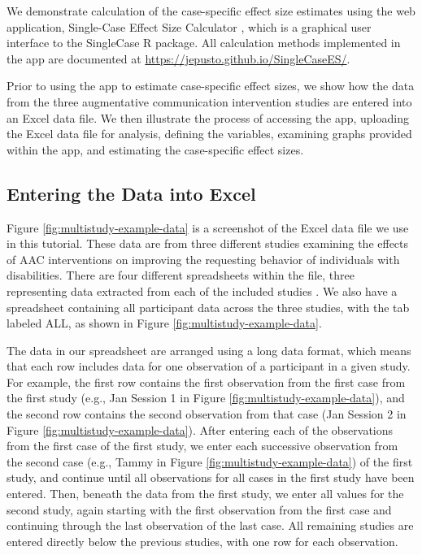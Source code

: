 \documentclass[
]{book}
\begin{document}
We demonstrate calculation of the case-specific effect size estimates using the web application, Single-Case Effect Size Calculator \citep{pustejovsky2023SingleCaseES}, which is a graphical user interface to the SingleCase R package. All calculation methods implemented in the app are documented at \url{https://jepusto.github.io/SingleCaseES/}.

Prior to using the app to estimate case-specific effect sizes, we show how the data from the three augmentative communication intervention studies are entered into an Excel data file. We then illustrate the process of accessing the app, uploading the Excel data file for analysis, defining the variables, examining graphs provided within the app, and estimating the case-specific effect sizes.

\hypertarget{entering-the-data-into-excel}{%
\subsection{Entering the Data into Excel}\label{entering-the-data-into-excel}}

Figure \ref{fig:multistudy-example-data} is a screenshot of the Excel data file we use in this tutorial. These data are from three different studies examining the effects of AAC interventions on improving the requesting behavior of individuals with disabilities. There are four different spreadsheets within the file, three representing data extracted from each of the included studies \citep{Byiers2014, Casey1978, StrasbergerFerreri2014}. We also have a spreadsheet containing all participant data across the three studies, with the tab labeled ALL, as shown in Figure \ref{fig:multistudy-example-data}.

The data in our spreadsheet are arranged using a long data format, which means that each row includes data for one observation of a participant in a given study. For example, the first row contains the first observation from the first case from the first study (e.g., Jan Session 1 in Figure \ref{fig:multistudy-example-data}), and the second row contains the second observation from that case (Jan Session 2 in Figure \ref{fig:multistudy-example-data}). After entering each of the observations from the first case of the first study, we enter each successive observation from the second case (e.g., Tammy in Figure \ref{fig:multistudy-example-data}) of the first study, and continue until all observations for all cases in the first study have been entered. Then, beneath the data from the first study, we enter all values for the second study, again starting with the first observation from the first case and continuing through the last observation of the last case. All remaining studies are entered directly below the previous studies, with one row for each observation.
\end{document}
